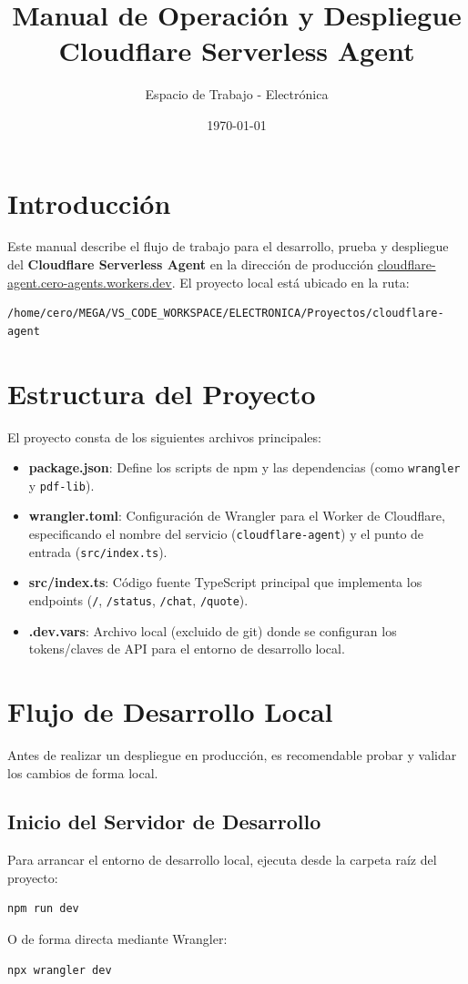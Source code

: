 \documentclass[11pt,a4paper]{article}
\title{Manual de Operación y Despliegue \\ \large Cloudflare Serverless Agent}
\author{Espacio de Trabajo - Electrónica}
\date{\today}
\begin{document}
\maketitle

\tableofcontents
\newpage

\section{Introducción}
Este manual describe el flujo de trabajo para el desarrollo, prueba y despliegue del \textbf{Cloudflare Serverless Agent} en la dirección de producción \href{https://cloudflare-agent.cero-agents.workers.dev/}{cloudflare-agent.cero-agents.workers.dev}. El proyecto local está ubicado en la ruta:
\begin{verbatim}
/home/cero/MEGA/VS_CODE_WORKSPACE/ELECTRONICA/Proyectos/cloudflare-agent
\end{verbatim}

\section{Estructura del Proyecto}
El proyecto consta de los siguientes archivos principales:
\begin{itemize}
    \item \textbf{package.json}: Define los scripts de npm y las dependencias (como \texttt{wrangler} y \texttt{pdf-lib}).
    \item \textbf{wrangler.toml}: Configuración de Wrangler para el Worker de Cloudflare, especificando el nombre del servicio (\texttt{cloudflare-agent}) y el punto de entrada (\texttt{src/index.ts}).
    \item \textbf{src/index.ts}: Código fuente TypeScript principal que implementa los endpoints (\texttt{/}, \texttt{/status}, \texttt{/chat}, \texttt{/quote}).
    \item \textbf{.dev.vars}: Archivo local (excluido de git) donde se configuran los tokens/claves de API para el entorno de desarrollo local.
\end{itemize}

\section{Flujo de Desarrollo Local}
Antes de realizar un despliegue en producción, es recomendable probar y validar los cambios de forma local.

\subsection{Inicio del Servidor de Desarrollo}
Para arrancar el entorno de desarrollo local, ejecuta desde la carpeta raíz del proyecto:
\begin{lstlisting}[language=bash]
npm run dev
\end{lstlisting}
O de forma directa mediante Wrangler:
\begin{lstlisting}[language=bash]
npx wrangler dev
\end{lstlisting}
\end{document}

